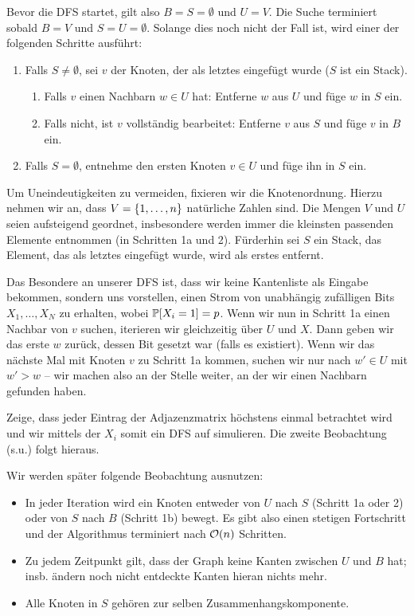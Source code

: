 Bevor die DFS startet, gilt also $B = S = \emptyset$ und $U = V$.
Die Suche terminiert sobald $B = V$ und $S = U = \emptyset$.
Solange dies noch nicht der Fall ist, wird einer der folgenden Schritte ausführt:

\begin{enumerate}
    \item Falls $S \ne \emptyset$, sei $v$ der Knoten, der als letztes eingefügt wurde ($S$ ist ein Stack).
          \begin{enumerate}
              \item Falls $v$ einen Nachbarn $w \in U$ hat: Entferne $w$ aus $U$ und füge $w$ in $S$ ein.
              \item Falls nicht, ist $v$ vollständig bearbeitet: Entferne $v$ aus $S$ und füge $v$ in $B$ ein.
          \end{enumerate}
    \item Falls $S = \emptyset$, entnehme den ersten Knoten $v \in U$ und füge ihn in $S$ ein.
\end{enumerate}

Um Uneindeutigkeiten zu vermeiden, fixieren wir die Knotenordnung.
Hierzu nehmen wir \oBdA an, dass $V = \left\{1, \ldots, n\right\}$ natürliche Zahlen sind.
Die Mengen $V$ und $U$ seien aufsteigend geordnet, insbesondere werden immer die kleinsten passenden Elemente entnommen (in Schritten 1a und 2).
Fürderhin sei $S$ ein Stack, \dh das Element, das als letztes eingefügt wurde, wird als erstes entfernt.

Das Besondere an unserer DFS ist, dass wir keine Kantenliste als Eingabe bekommen, sondern uns vorstellen, einen Strom von unabhängig zufälligen Bits $X_1, \ldots, X_N$ zu erhalten, wobei $\mathbb{P}\!\left[X_i = 1\right] = p$.
Wenn wir nun in Schritt 1a einen Nachbar von $v$ suchen, iterieren wir gleichzeitig über $U$ und $X$.
Dann geben wir das erste $w$ zurück, dessen Bit gesetzt war (falls es existiert).
Wenn wir das nächste Mal mit Knoten $v$ zu Schritt 1a kommen, suchen wir nur nach $w' \in U$ mit $w' > w$ -- wir machen also an der Stelle weiter, an der wir einen Nachbarn gefunden haben.

\begin{exercise}
    Zeige, dass jeder Eintrag der Adjazenzmatrix höchstens einmal betrachtet wird und wir mittels der $X_i$ somit ein DFS auf \Gnp simulieren.
    Die zweite Beobachtung (s.u.) folgt hieraus.
\end{exercise}

\noindent
Wir werden später folgende Beobachtung ausnutzen:
\begin{itemize}
    \item In jeder Iteration wird ein Knoten entweder von $U$ nach $S$ (Schritt 1a oder 2) oder von $S$ nach $B$ (Schritt 1b) bewegt.
          Es gibt also einen stetigen Fortschritt und der Algorithmus terminiert nach $\mathcal{O}\!\left(n\right)$ Schritten.
    \item Zu jedem Zeitpunkt gilt, dass der Graph keine Kanten zwischen $U$ und $B$ hat; insb. ändern noch nicht entdeckte Kanten hieran nichts mehr.
    \item Alle Knoten in $S$ gehören zur selben Zusammenhangskomponente.
\end{itemize}

